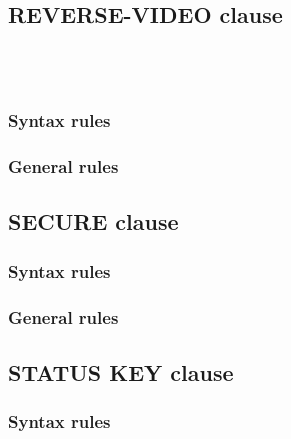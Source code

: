 \subsection{REVERSE-VIDEO clause}

\begin{syntax}
  \begin{1=}
     \\
     \\
  \end{1=}
\end{syntax}

\subsubsection{Syntax rules}

\subsubsection{General rules}

\subsection{SECURE clause}

\begin{syntax}
\end{syntax}

\subsubsection{Syntax rules}

\subsubsection{General rules}

\subsection{STATUS KEY clause}

\begin{syntax}[\deletedcolour]
\end{syntax}

\subsubsection{Syntax rules}

